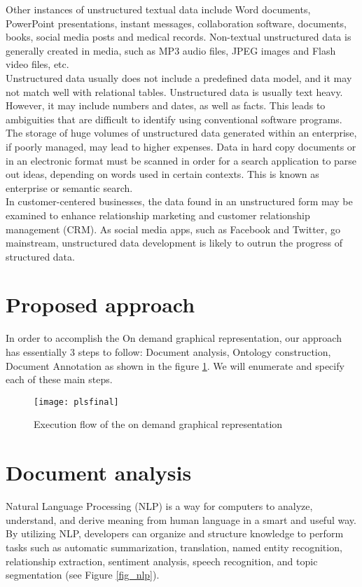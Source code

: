 Other instances of unstructured textual data include Word documents, PowerPoint presentations, instant messages, collaboration software, documents, books, social media posts and medical records. Non-textual unstructured data is generally created in media, such as MP3 audio files, JPEG images and Flash video files, etc. \\

Unstructured data usually does not include a predefined data model, and it may not match well with relational tables. Unstructured data is usually text heavy. However, it may include numbers and dates, as well as facts. This leads to ambiguities that are difficult to identify using conventional software programs. \\


The storage of huge volumes of unstructured data generated within an enterprise, if poorly managed, may lead to higher expenses. Data in hard copy documents or in an electronic format must be scanned in order for a search application to parse out ideas, depending on words used in certain contexts. This is known as enterprise or semantic search. \\

In customer-centered businesses, the data found in an unstructured form may be examined to enhance relationship marketing and customer relationship management (CRM). As social media apps, such as Facebook and Twitter, go mainstream, unstructured data development is likely to outrun the progress of structured data.  \\

\section{Proposed approach}
In order to accomplish the On demand graphical representation, our approach has essentially 3 steps to follow: Document analysis, Ontology construction, Document Annotation as shown in the figure \ref{fig_app}. We will enumerate and specify each of these main steps.  



\begin{figure}[H]
\centering
\texttt{[image: plsfinal]}
\caption{Execution flow of the on demand graphical representation}
\label{fig_app}
\end{figure}

\section{Document analysis}
\label{sec_anal}
Natural Language Processing (NLP) \cite{nlp} is a way for computers to analyze, understand, and derive meaning from human language in a smart and useful way. By utilizing NLP, developers can organize and structure knowledge to perform tasks such as automatic summarization, translation, named entity recognition, relationship extraction, sentiment analysis, speech recognition, and topic segmentation (see Figure \ref{fig_nlp}).

